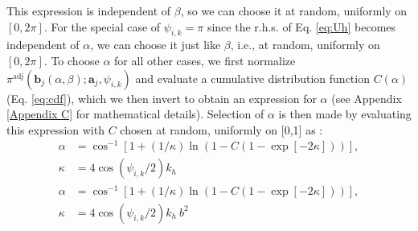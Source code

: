             This expression is independent of $\beta$, so we can choose it at random, uniformly on $[0, 2\pi]$. For the special case of $\psi_{i,k} = \pi$ since the r.h.s. of Eq. \eqref{eq:Uh} becomes independent of $\alpha$, we can choose it just like $\beta$, i.e., at random, uniformly on $[0, 2\pi]$. To choose $\alpha$ for all other cases, we first normalize $\pi^\text{adj} \left( {\mathbf b}_j(\alpha, \beta); \mathbf{a}_j, \psi_{i,k} \right) $ and evaluate a cumulative distribution function $C(\alpha)$ (Eq. \eqref{eq:cdf}), which we then invert to obtain an expression for $\alpha$ (see Appendix \ref{Appendix C} for mathematical details). Selection of $\alpha$ is then made by evaluating this expression with $C$ chosen at random, uniformly on [0,1] as :
                    \ifkhExplicitP
                        \begin{equation}
                        \label{eq:alpha}
                            \begin{aligned}
                                \alpha &= \cos^{-1} \left[1 +  (1/\kappa)\ln\left(1 - C (1-\exp[-2\kappa]) \right) \right],\\
                                \kappa &= 4 \cos(\psi_{i,k}/2) k_h
                            \end{aligned}
                        \end{equation}
                    \else
                        \begin{equation}
                        \label{eq:alpha}
                            \begin{aligned}
                                \alpha &= \cos^{-1} \left[1 +  (1/\kappa)\ln\left(1 - C (1-\exp[-2\kappa]) \right) \right],\\
                                \kappa &= 4 \cos(\psi_{i,k}/2) k_h~b^2
                            \end{aligned}
                        \end{equation}
                    \fi

